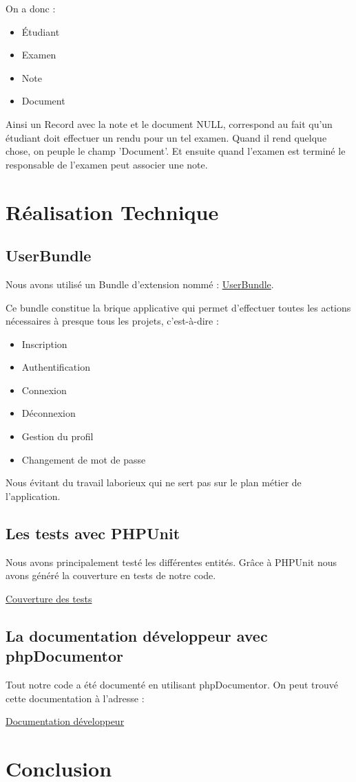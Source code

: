 \documentclass{report}
\begin{document}
			On a donc :
			\begin{itemize}
				\item{Étudiant}
				\item{Examen}
				\item{Note}
				\item{Document}
			\end{itemize}

			Ainsi un Record avec la note et le document NULL, correspond au fait qu'un étudiant doit effectuer un rendu pour un tel examen. Quand il rend quelque chose, on peuple le champ 'Document'. Et ensuite quand l'examen est terminé le responsable de l'examen peut associer une note.


  \section{Réalisation Technique}
    \subsection{UserBundle}
      Nous avons utilisé un Bundle d'extension nommé : 
      \href{https://github.com/FriendsOfSymfony/FOSUserBundle}{UserBundle}.
      
      Ce bundle constitue la brique applicative qui permet d'effectuer toutes les actions nécessaires à presque tous les projets, c'est-à-dire :
      \begin{itemize}
        \item{Inscription}
        \item{Authentification}
        \item{Connexion}
        \item{Déconnexion}
        \item{Gestion du profil}
        \item{Changement de mot de passe}
      \end{itemize}
      Nous évitant du travail laborieux qui ne sert pas sur le plan métier de l'application.

    \subsection{Les tests avec PHPUnit}
			Nous avons principalement testé les différentes entités. Grâce à PHPUnit nous avons généré la couverture en tests de notre code.

			\href{http://ares-ensiie.eu/~unbekandt2011/UnsapaIPW/cov}{Couverture des tests}
    \subsection{La documentation développeur avec phpDocumentor}
			Tout notre code a été documenté en utilisant phpDocumentor. On peut trouvé cette documentation à l'adresse :

			\href{http://ares-ensiie.eu/~unbekandt2011/UnsapaIPW/doc}{Documentation développeur}

  \section*{Conclusion}
\end{document}
